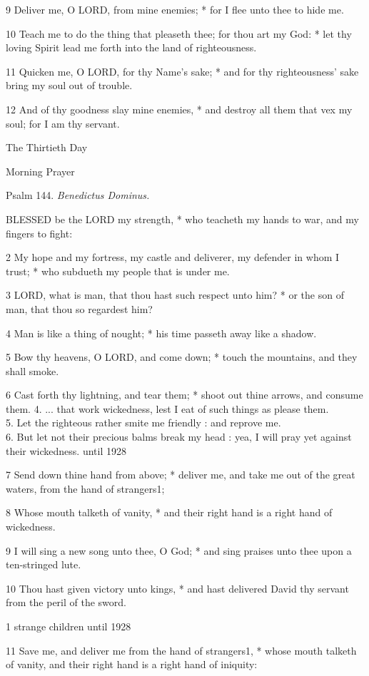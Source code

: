 9 Deliver me, O LORD, from mine enemies; * for I flee
unto thee to hide me.

10 Teach me to do the thing that pleaseth thee; for
thou art my God: * let thy loving Spirit lead me forth into the land of
righteousness.

11 Quicken me, O LORD, for thy Name's sake; * and for
thy righteousness' sake bring my soul out of trouble.

12 And of thy goodness slay mine enemies, * and destroy
all them that vex my soul; for I am thy servant. 

The
Thirtieth Day

Morning Prayer

Psalm
144. \emph{Benedictus Dominus.}

BLESSED
be the LORD my strength, * who teacheth my hands to war, and my fingers
to fight:

2 My hope and my fortress, my castle and deliverer,
my defender in whom I trust; * who subdueth my people that is under me.

3 LORD, what is man, that thou hast such respect unto
him? * or the son of man, that thou so regardest him?

4 Man is like a thing of nought; * his time passeth
away like a shadow.

5 Bow thy heavens, O LORD, and come down; * touch the
mountains, and they shall smoke.

6 Cast forth thy lightning, and tear them; * shoot
out thine arrows, and consume them. 4. ... that work wickedness,
lest I eat of such things as please them.\\
5. Let the righteous
rather smite me friendly : and reprove me.\\
6. But
let not their precious balms break my head : yea, I will pray yet against
their wickedness. until
1928

7 Send down thine hand from above; * deliver me, and take me out of the
great waters, from the hand of strangers1;

8 Whose mouth talketh of vanity, * and their right hand
is a right hand of wickedness.

9 I will sing a new song unto thee, O God; * and sing
praises unto thee upon a ten-stringed lute.

10 Thou hast given victory unto kings, * and hast delivered
David thy servant from the peril of the sword.

1 strange children until
1928

11 Save me, and deliver me from the hand of strangers1, * whose
mouth talketh of vanity, and their right hand is a right hand of iniquity:

